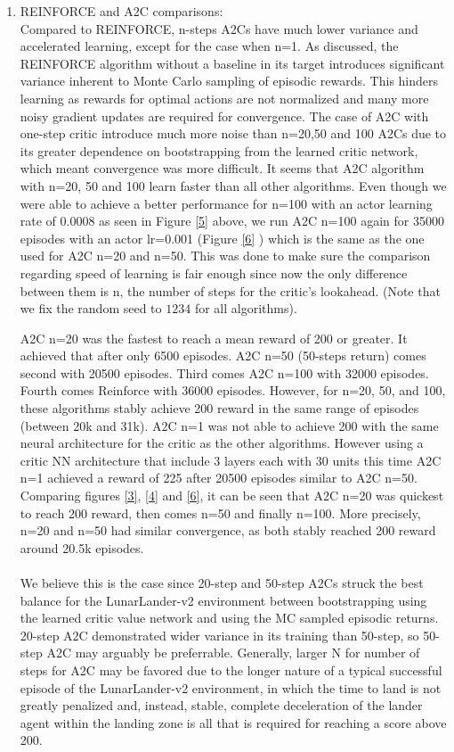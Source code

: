 \documentclass[12pt]{article}
\begin{document}
\begin{enumerate}
		\item  REINFORCE and A2C comparisons:\\
		Compared to REINFORCE, n-steps A2Cs have much lower variance and accelerated learning, except for the case when n=1. As discussed, the REINFORCE algorithm without a baseline in its target introduces significant variance inherent to Monte Carlo sampling of episodic rewards. This hinders learning as rewards for optimal actions are not normalized and many more noisy gradient updates are required for convergence. The case of A2C with one-step critic introduce much more noise than n=20,50 and 100 A2Cs due to its greater dependence on bootstrapping from the learned critic network, which meant convergence was more difficult. 
		It seems that A2C algorithm with n=20, 50 and 100 learn faster than all other algorithms. Even though we were able to achieve a better performance for n=100 with an actor learning rate  of 0.0008 as seen in Figure \ref{5} above, we run A2C n=100 again for 35000 episodes with an actor lr=0.001 (Figure \ref{6} ) which is the same as the one used for A2C n=20 and n=50. This was done to make sure the comparison regarding speed of learning is fair enough since now the only difference between them is n, the number of steps for the critic's lookahead. (Note that we fix the random seed to $1234$ for all algorithms). 
		
		A2C n=20 was the fastest to reach a mean reward of 200 or greater. It achieved that after only 6500 episodes.
		A2C n=50 (50-steps return) comes second with 20500 episodes.  
		Third comes A2C n=100 with 32000 episodes. 
		Fourth comes Reinforce with 36000 episodes. However, for n=20, 50, and 100, these algorithms stably achieve 200 reward in the same range of episodes (between 20k and 31k).
		A2C n=1 was not able to achieve 200 with the same neural architecture for the critic as the other algorithms. However using a critic NN architecture that include 3 layers each with 30 units this time A2C n=1 achieved a reward of 225 after 20500 episodes similar to A2C n=50.
		Comparing figures \ref{3}, \ref{4} and \ref{6},
		it can be seen that A2C n=20 was quickest to reach 200 reward, then comes n=50 and finally n=100. More precisely, n=20 and n=50 had similar convergence, as both stably reached 200 reward around 20.5k episodes. \\\\
		We believe this is the case since 20-step and 50-step A2Cs struck the best balance for the LunarLander-v2 environment between bootstrapping using the learned critic value network and using the MC sampled episodic returns. 20-step A2C demonstrated wider variance in its training than 50-step, so 50-step A2C may arguably be preferrable. Generally, larger N for number of steps for A2C may be favored due to the longer nature of a typical successful episode of the LunarLander-v2 environment, in which the time to land is not greatly penalized and, instead, stable, complete deceleration of the lander agent within the landing zone is all that is required for reaching a score above 200. 
		
		
		
		
	\end{enumerate}
	
	
	
	
\end{document}
